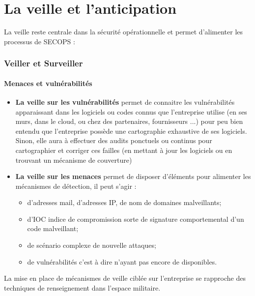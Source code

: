 \section{La veille et l'anticipation}

La veille reste centrale dans la sécurité opérationnelle et permet d'alimenter les processus de SECOPS :

\begin{frame}
\frametitle<presentation>{Veiller et Surveiller}
\framesubtitle<presentation>{Menaces et vulnérabilités}
\begin{itemize}
  \item\textbf{ La veille sur les vulnérabilités} permet de connaitre les vulnérabilités apparaissant dans les logiciels ou codes connus que l'entreprise utilise (en ses murs, dans le cloud, ou chez des partenaires, fournisseurs ...) pour peu bien entendu que l'entreprise possède une cartographie exhaustive de ses logiciels. Sinon, elle aura à effectuer des audits ponctuels ou continus pour cartographier et corriger ces failles (en mettant à jour les logiciels ou en trouvant un mécanisme de couverture)
  \item  \textbf{La veille sur les menaces} permet de disposer d'éléments pour alimenter les mécanismes de détection, il peut s'agir :
\begin{itemize}
  \item  d'adresses mail, d'adresses IP, de nom de domaines malveillants;
  \item  d'IOC indice de compromission sorte de signature comportemental d'un code malveillant;
  \item de scénario complexe de nouvelle attaques;
  \item de vulnérabilités  c'est à dire n'ayant pas encore de  disponibles.
\end{itemize}
\end{itemize}
\end{frame}

La mise en place de mécanismes de veille ciblée sur l'entreprise se rapproche des techniques de renseignement dans l'espace militaire.

